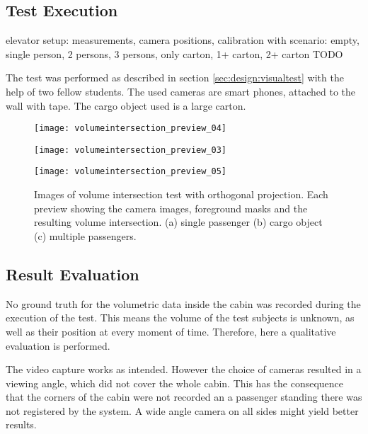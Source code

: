 \subsection{Test Execution}
elevator setup: measurements, camera positions, calibration with \autocite[][]{smid2015calibration}
scenario: empty, single person, 2 persons, 3 persons, only carton, 1+ carton, 2+ carton
TODO

The test was performed as described in section \ref{sec:design:visualtest} with the help of two fellow students.
The used cameras are smart phones, attached to the wall with tape.
The cargo object used is a large carton.

\begin{figure}[p]
    \centering
    \texttt{[image: volumeintersection\_preview\_04]}
    
    \vspace{0.5em}
    
    \texttt{[image: volumeintersection\_preview\_03]}
    
    \vspace{0.5em}
    
    \texttt{[image: volumeintersection\_preview\_05]}
    
    \caption[Images of volume intersection test with orthogonal projection]{Images of volume intersection test with orthogonal projection. Each preview showing the camera images, foreground masks and the resulting volume intersection. (a) single passenger (b) cargo object (c) multiple passengers.}
    \label{fig:impl:videopreview}
\end{figure}

\subsection{Result Evaluation}
No ground truth for the volumetric data inside the cabin was recorded during the execution of the test.
This means the volume of the test subjects is unknown, as well as their position at every moment of time.
Therefore, here a qualitative evaluation is performed. 

The video capture works as intended.
However the choice of cameras resulted in a viewing angle, which did not cover the whole cabin.
This has the consequence that the corners of the cabin were not recorded an a passenger standing there was not registered by the system.
A wide angle camera on all sides might yield better results.

